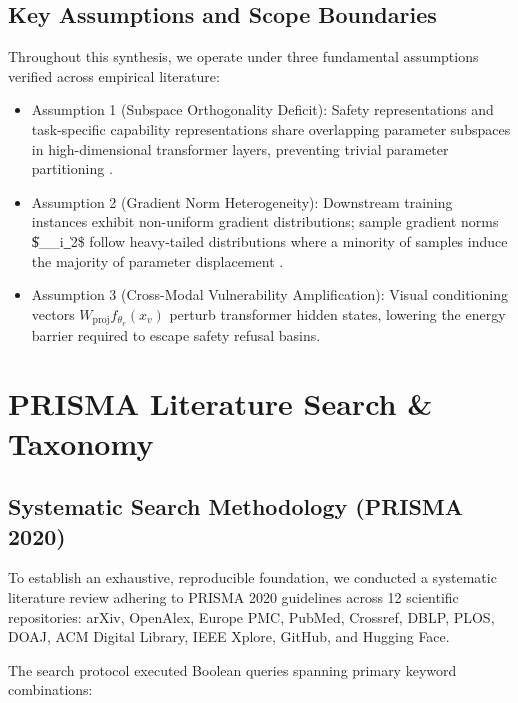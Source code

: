 \documentclass[10pt,journal,compsoc,twocolumn]{IEEEtran}
\begin{document}
\subsection{Key Assumptions and Scope Boundaries}

Throughout this synthesis, we operate under three fundamental assumptions verified across empirical literature:
\begin{itemize}
  \item Assumption 1 (Subspace Orthogonality Deficit): Safety representations and task-specific capability representations share overlapping parameter subspaces in high-dimensional transformer layers, preventing trivial parameter partitioning \cite{arxiv_2406_00584}.
  \item Assumption 2 (Gradient Norm Heterogeneity): Downstream training instances exhibit non-uniform gradient distributions; sample gradient norms \$\|\nabla\_\Theta {}\_i\|\_2\$ follow heavy-tailed distributions where a minority of samples induce the majority of parameter displacement \cite{arxiv_2604_17215}.
  \item Assumption 3 (Cross-Modal Vulnerability Amplification): Visual conditioning vectors $W_{\text{proj}} f_{\theta_v}(x_v)$ perturb transformer hidden states, lowering the energy barrier required to escape safety refusal basins.
\end{itemize}




\section{PRISMA Literature Search \& Taxonomy}



\subsection{Systematic Search Methodology (PRISMA 2020)}

To establish an exhaustive, reproducible foundation, we conducted a systematic literature review adhering to PRISMA 2020 guidelines across 12 scientific repositories: arXiv, OpenAlex, Europe PMC, PubMed, Crossref, DBLP, PLOS, DOAJ, ACM Digital Library, IEEE Xplore, GitHub, and Hugging Face.

The search protocol executed Boolean queries spanning primary keyword combinations:
\end{document}
